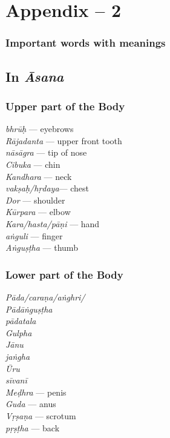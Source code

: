 \chapter{Appendix – 2}

\subsection*{Important words with meanings}

\section*{In \textit{Āsana}}

\subsection*{Upper part of the Body}

\begin{multicols}{2}
\textit{bhrūḥ} --- eyebrows\\
\textit{Rājadanta} --- upper front tooth\\
\textit{nāsāgra} --- tip of nose\\
\textit{Cibuka} --- chin\\
\textit{Kandhara} --- neck \\
\textit{vakṣaḥ/hṛdaya}--- chest \\
\textit{Dor} --- shoulder\\
\textit{Kūrpara} --- elbow\\ 
\textit{Kara/hasta/pāṇi} --- hand\\
\textit{aṅguli} --- finger\\
\textit{Aṅguṣṭha} --- thumb
\end{multicols}

\subsection*{Lower part of the Body}

\begin{multicols}{2}
\textit{Pāda/caraṇa/aṅghri/} \\
\textit{Pādāṅguṣṭha} \\
\textit{pādatala} \\
\textit{Gulpha} \\
\textit{Jānu} \\
\textit{jaṅgha} \\
\textit{Ūru} \\
\textit{sīvanī} \\
\textit{Meḍhra} --- penis\\
\textit{Guda} --- anus  \\
\textit{Vṛṣaṇa} --- scrotum\\
\textit{pṛṣṭha} --- back
\end{multicols}

